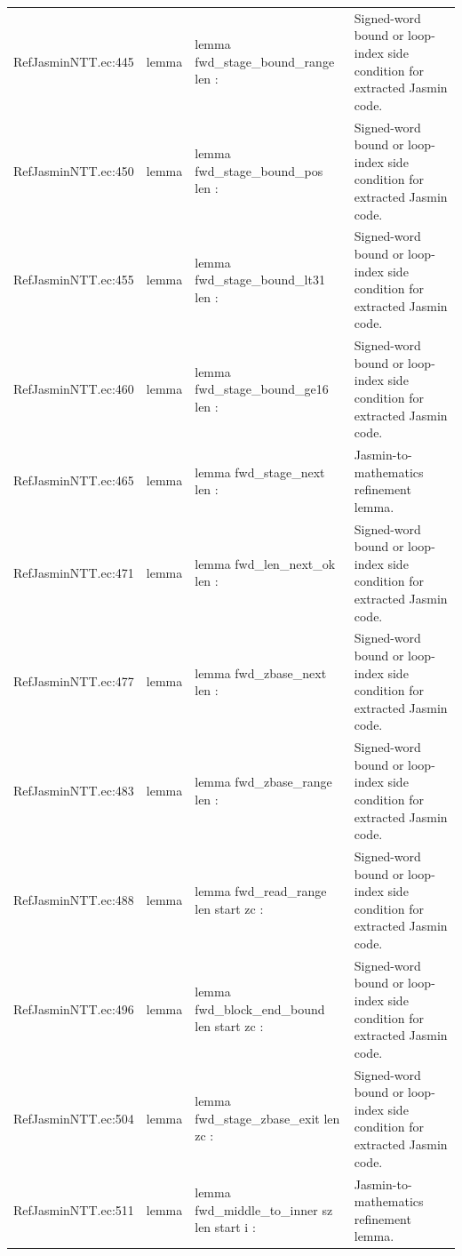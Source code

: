 \documentclass[10pt]{article}
\begin{document}
\begin{longtable}{L{0.11\textwidth}L{0.05\textwidth}L{0.38\textwidth}L{0.42\textwidth}}
RefJasminNTT.\allowbreak{}ec:\allowbreak{}445 & lemma & {\ttfamily\scriptsize lemma fwd\_stage\_bound\_range len :} & Signed-word bound or loop-index side condition for extracted Jasmin code. \\
RefJasminNTT.\allowbreak{}ec:\allowbreak{}450 & lemma & {\ttfamily\scriptsize lemma fwd\_stage\_bound\_pos len :} & Signed-word bound or loop-index side condition for extracted Jasmin code. \\
RefJasminNTT.\allowbreak{}ec:\allowbreak{}455 & lemma & {\ttfamily\scriptsize lemma fwd\_stage\_bound\_lt31 len :} & Signed-word bound or loop-index side condition for extracted Jasmin code. \\
RefJasminNTT.\allowbreak{}ec:\allowbreak{}460 & lemma & {\ttfamily\scriptsize lemma fwd\_stage\_bound\_ge16 len :} & Signed-word bound or loop-index side condition for extracted Jasmin code. \\
RefJasminNTT.\allowbreak{}ec:\allowbreak{}465 & lemma & {\ttfamily\scriptsize lemma fwd\_stage\_next len :} & Jasmin-to-mathematics refinement lemma. \\
RefJasminNTT.\allowbreak{}ec:\allowbreak{}471 & lemma & {\ttfamily\scriptsize lemma fwd\_len\_next\_ok len :} & Signed-word bound or loop-index side condition for extracted Jasmin code. \\
RefJasminNTT.\allowbreak{}ec:\allowbreak{}477 & lemma & {\ttfamily\scriptsize lemma fwd\_zbase\_next len :} & Signed-word bound or loop-index side condition for extracted Jasmin code. \\
RefJasminNTT.\allowbreak{}ec:\allowbreak{}483 & lemma & {\ttfamily\scriptsize lemma fwd\_zbase\_range len :} & Signed-word bound or loop-index side condition for extracted Jasmin code. \\
RefJasminNTT.\allowbreak{}ec:\allowbreak{}488 & lemma & {\ttfamily\scriptsize lemma fwd\_read\_range len start zc :} & Signed-word bound or loop-index side condition for extracted Jasmin code. \\
RefJasminNTT.\allowbreak{}ec:\allowbreak{}496 & lemma & {\ttfamily\scriptsize lemma fwd\_block\_end\_bound len start zc :} & Signed-word bound or loop-index side condition for extracted Jasmin code. \\
RefJasminNTT.\allowbreak{}ec:\allowbreak{}504 & lemma & {\ttfamily\scriptsize lemma fwd\_stage\_zbase\_exit len zc :} & Signed-word bound or loop-index side condition for extracted Jasmin code. \\
RefJasminNTT.\allowbreak{}ec:\allowbreak{}511 & lemma & {\ttfamily\scriptsize lemma fwd\_middle\_to\_inner sz len start i :} & Jasmin-to-mathematics refinement lemma. \\

\end{longtable}
\end{document}
